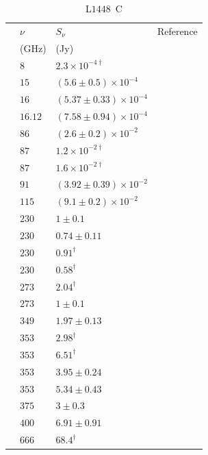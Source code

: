 \documentclass[9pt]{extarticle}   	%
\begin{document}
\begin{table}
\caption{L$1448$~C}
\begin{center}
\begin{tabular}{llll}
\hline
 & $\nu$ & $S_\nu$ & Reference\\
 & (GHz) & (Jy) & \\
\hline
 & $8$ & $2.3\times10^{-4\dag}$ & \citet{2002AJ....124.1045R}\\
 & $15$ & $(5.6\pm0.5)\times10^{-4}$ & \citet{1990ApJ...365L..85C}\\
 & $16$ & $(5.37\pm0.33)\times10^{-4}$ & \citet{2011MNRAS.415..893A}\\
 & $16.12$ & $(7.58\pm0.94)\times10^{-4}$ & \citet{2012MNRAS.423.1089A}\\
 & $86$ & $(2.6\pm0.2)\times10^{-2}$ & \citet{2000ApJS..131..249S}\\
 & $87$ & $1.2\times10^{-2\dag}$ & \citet{1991AA...241L..43B}\\
 & $87$ & $1.6\times10^{-2\dag}$ & \citet{1992AA...265L..49G}\\
 & $91$ & $(3.92\pm0.39)\times10^{-2}$ & \citet{2011AJ....141...39S}\\
 & $115$ & $(9.1\pm0.2)\times10^{-2}$ & \citet{2000ApJS..131..249S}\\
 & $230$ & $1\pm0.1$ & \citet{1998ApJ...509..733B}\\
 & $230$ & $0.74\pm0.11$ & \citet{2000ApJS..131..249S}\\
 & $230$ & $0.91^{\dag}$ & \citet{2001AA...365..440M}\\
 & $230$ & $0.58^{\dag}$ & \citet{1991AA...241L..43B}\\
 & $273$ & $2.04^{\dag}$ & \citet{2006ApJ...638..293E}\\
 & $273$ & $1\pm0.1$ & \citet{1998ApJ...509..733B}\\
 & $349$ & $1.97\pm0.13$ & \citet{2011AJ....141...39S}\\
 & $353$ & $2.98^{\dag}$ & \citet{2008ApJS..175..277D}\\
 & $353$ & $6.51^{\dag}$ & \citet{2007AA...468.1009H}\\
 & $353$ & $3.95\pm0.24$ & \citet{2000ApJS..131..249S}\\
 & $353$ & $5.34\pm0.43$ & \citet{2000ApJ...530..851C}\\
 & $375$ & $3\pm0.3$ & \citet{1998ApJ...509..733B}\\
 & $400$ & $6.91\pm0.91$ & \citet{2000ApJ...530..851C}\\
 & $666$ & $68.4^{\dag}$ & \citet{2007AA...468.1009H}\\

\end{tabular}
\end{center}
\end{table}
\end{document}
